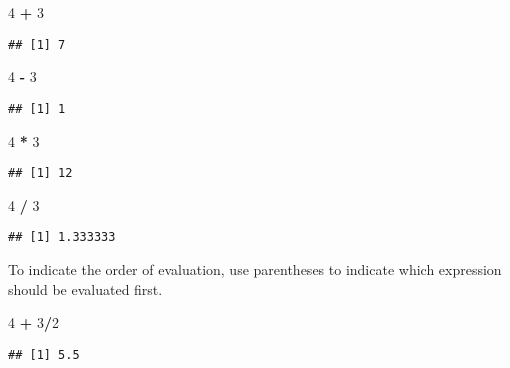 \documentclass[]{article}
\newenvironment{Shaded}{\begin{snugshade}}{\end{snugshade}}
\newcommand{\DecValTok}[1]{\textcolor[rgb]{0.00,0.00,0.81}{#1}}
\newcommand{\StringTok}[1]{\textcolor[rgb]{0.31,0.60,0.02}{#1}}
\newcommand{\OperatorTok}[1]{\textcolor[rgb]{0.81,0.36,0.00}{\textbf{#1}}}
\begin{document}
\begin{Shaded}
\begin{Highlighting}[]
\DecValTok{4} \OperatorTok{+}\StringTok{ }\DecValTok{3}
\end{Highlighting}
\end{Shaded}

\begin{verbatim}
## [1] 7
\end{verbatim}

\begin{Shaded}
\begin{Highlighting}[]
\DecValTok{4} \OperatorTok{-}\StringTok{ }\DecValTok{3}
\end{Highlighting}
\end{Shaded}

\begin{verbatim}
## [1] 1
\end{verbatim}

\begin{Shaded}
\begin{Highlighting}[]
\DecValTok{4} \OperatorTok{*}\StringTok{ }\DecValTok{3}
\end{Highlighting}
\end{Shaded}

\begin{verbatim}
## [1] 12
\end{verbatim}

\begin{Shaded}
\begin{Highlighting}[]
\DecValTok{4} \OperatorTok{/}\StringTok{ }\DecValTok{3}
\end{Highlighting}
\end{Shaded}

\begin{verbatim}
## [1] 1.333333
\end{verbatim}

To indicate the order of evaluation, use parentheses to indicate which
expression should be evaluated first.

\begin{Shaded}
\begin{Highlighting}[]
\DecValTok{4} \OperatorTok{+}\StringTok{ }\DecValTok{3}\OperatorTok{/}\DecValTok{2}
\end{Highlighting}
\end{Shaded}

\begin{verbatim}
## [1] 5.5
\end{verbatim}
\end{document}
